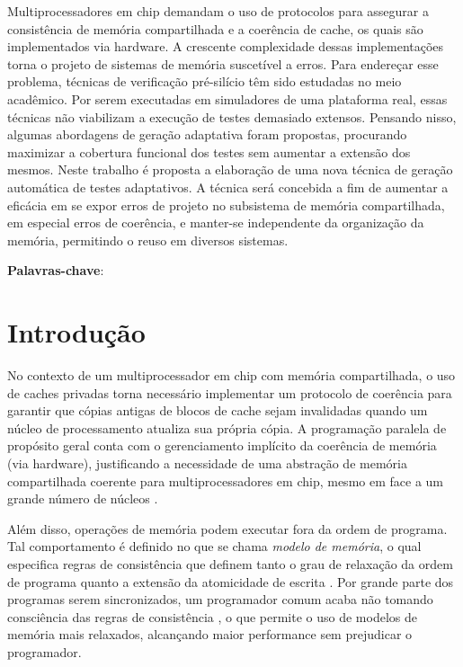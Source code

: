 \documentclass{ufsc-thesis} %
\begin{document}
\begin{resumo}
    \small
    Multiprocessadores em chip demandam o uso de protocolos para assegurar a
    consistência de memória compartilhada e a coerência de cache, os quais são
    implementados via hardware. A crescente complexidade dessas implementações
    torna o projeto de sistemas de memória suscetível a erros. Para endereçar
    esse problema, técnicas de verificação pré-silício têm sido estudadas no
    meio acadêmico. Por serem executadas em simuladores de uma plataforma real,
    essas técnicas não viabilizam a execução de testes demasiado extensos.
    Pensando nisso, algumas abordagens de geração adaptativa foram propostas,
    procurando maximizar a cobertura funcional dos testes sem aumentar a
    extensão dos mesmos. Neste trabalho é proposta a elaboração de uma nova
    técnica de geração automática de testes adaptativos. A técnica será
    concebida a fim de aumentar a eficácia em se expor erros de projeto no
    subsistema de memória compartilhada, em especial erros de coerência, e
    manter-se independente da organização da memória, permitindo o reuso em
    diversos sistemas.

    \vspace{\onelineskip}
    \noindent
    \textbf{Palavras-chave}: \listaassuntos
\end{resumo}

\afterpage{\null\newpage}

\tableofcontents

\chapter{Introdução}

No contexto de um multiprocessador em chip com memória compartilhada, o uso de
caches privadas torna necessário implementar um protocolo de coerência para
garantir que cópias antigas de blocos de cache sejam invalidadas quando um
núcleo de processamento atualiza sua própria cópia.  A programação paralela de
propósito geral conta com o gerenciamento implícito da coerência de memória
(via hardware), justificando a necessidade de uma abstração de memória
compartilhada coerente para multiprocessadores em chip, mesmo em face a um
grande número de núcleos \cite{Devadas:2013}.

Além disso, operações de memória podem executar fora da ordem de programa. Tal
comportamento é definido no que se chama \textit{modelo de memória}, o qual
especifica regras de consistência que definem tanto o grau de relaxação da
ordem de programa quanto a extensão da atomicidade de escrita \cite{Adve:1996}.
Por grande parte dos programas serem sincronizados, um programador comum acaba
não tomando consciência das regras de consistência \cite{Hennessy:2011}, o que
permite o uso de modelos de memória mais relaxados, alcançando maior
performance sem prejudicar o programador.
\end{document}
